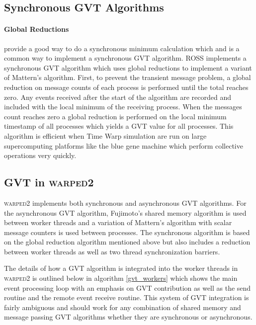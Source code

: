 \documentclass[11pt]{book}
\begin{document}
\subsection{Synchronous GVT Algorithms}

\paragraph{Global Reductions} provide a good way to do a synchronous minimum calculation which and
is a common way to implement a synchronous GVT algorithm.  ROSS implements a synchronous GVT
algorithm which uses global reductions to implement a variant of Mattern's
algorithm\cite{holder-08}.  First, to prevent the transient message problem, a global reduction on
message counts of each process is performed until the total reaches zero.  Any events received after
the start of the algorithm are recorded and included with the local minimum of the receiving
process.  When the messages count reaches zero a global reduction is performed on the local minimum
timestamp of all processes which yields a GVT value for all processes.  This algorithm is efficient
when Time Warp simulation are run on large supercomputing platforms like the blue gene machine which
perform collective operations very quickly.

\subsection{GVT in \textsc{warped2}}

\textsc{warped2} implements both synchronous and asynchronous GVT algorithms.  For the asynchronous
GVT algorithm, Fujimoto's shared memory algorithm is used between worker threads and a variation of
Mattern's algorithm with scalar message counters is used between processes.  The synchronous
algorithm is based on the global reduction algorithm mentioned above but also includes a reduction
between worker threads as well as two thread synchronization barriers.

The details of how a GVT algorithm is integrated into the worker threads in \textsc{warped2} is
outlined below in algorithm \ref{gvt_workers} which shows the main event processing loop with an
emphasis on GVT contribution as well as the send routine and the remote event receive routine.  This
system of GVT integration is fairly ambiguous and should work for any combination of shared memory
and message passing GVT algorithms whether they are synchronous or asynchronous.
\end{document}
